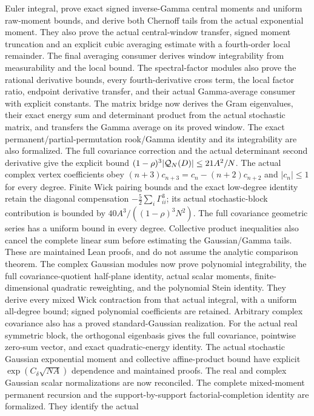 \documentclass[11pt]{article}
\theoremstyle{remark}
\begin{document}
Euler integral, prove exact signed inverse-Gamma central moments
and uniform raw-moment bounds, and derive both Chernoff tails
from the actual exponential moment. They also prove the actual
central-window transfer, signed moment truncation and an explicit
cubic averaging estimate with a fourth-order local remainder.
The final averaging consumer derives window integrability from
measurability and the local bound. The spectral-factor modules
also prove the rational derivative bounds, every fourth-derivative
cross term, the local factor ratio, endpoint derivative transfer,
and their actual Gamma-average consumer with explicit constants.
The matrix bridge now derives the Gram eigenvalues, their exact
energy sum and determinant product from the actual stochastic matrix,
and transfers the Gamma average on its proved window.
The exact permanent/partial-permutation rook/Gamma identity and
its integrability are also formalized. The full covariance correction
and the actual determinant second derivative give the explicit bound
\((1-\rho)^3|{\cal Q}_N(D)|\leq21A^2/N\).
The actual complex vertex coefficients obey
\((n+3)c_{n+3}=c_n-(n+2)c_{n+2}\) and \(|c_n|\leq1\)
for every degree. Finite Wick pairing bounds and the exact low-degree
identity retain the diagonal compensation
\(-\tfrac52\sum_i\Gamma_{ii}^3\); its actual stochastic-block
contribution is bounded by \(40A^3/((1-\rho)^3N^2)\).
The full covariance geometric series has a uniform bound in every
degree. Collective product inequalities also cancel the complete
linear sum before estimating the Gaussian/Gamma tails.
These are maintained Lean proofs, and do not assume the analytic
comparison theorem.
The complex Gaussian modules now prove polynomial integrability,
the full covariance-quotient half-plane identity, actual scalar moments,
finite-dimensional quadratic reweighting, and the polynomial Stein identity.
They derive every mixed Wick contraction from that actual integral,
with a uniform all-degree bound; signed polynomial coefficients are retained.
Arbitrary complex covariance also has a proved standard-Gaussian
realization. For the actual real symmetric block, the orthogonal
eigenbasis gives the full covariance, pointwise zero-sum vector,
and exact quadratic-energy identity. The actual stochastic Gaussian
exponential moment and collective affine-product bound have explicit
\(\exp(C_\delta\sqrt{NA})\) dependence and maintained proofs.
The real and complex Gaussian scalar normalizations are now reconciled.
The complete mixed-moment permanent recursion and the support-by-support
factorial-completion identity are formalized. They identify the actual
\end{document}
